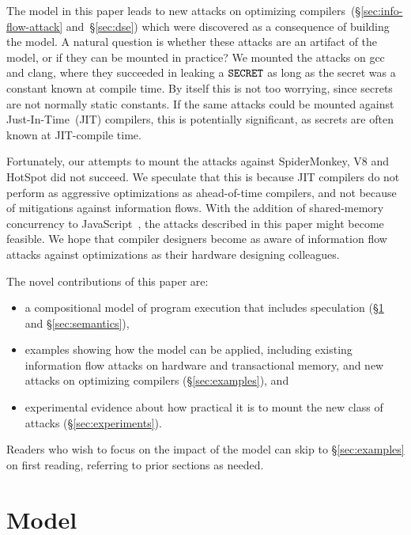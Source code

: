\documentclass[conference]{IEEEtran}
\theoremstyle{plain}
\theoremstyle{definition}
\begin{document}
The model in this paper leads to new attacks on optimizing
compilers~(\S\ref{sec:info-flow-attack} and~\S\ref{sec:dse}) which
were discovered as a consequence of building the model. A natural
question is whether these attacks are an artifact of the model, or if
they can be mounted in practice? We mounted the attacks on gcc and
clang, where they succeeded in leaking a $\texttt{SECRET}$ as long as the secret
was a constant known at compile time. By itself this is not too
worrying, since secrets are not normally static constants. If the same
attacks could be mounted against Just-In-Time~(JIT) compilers, this
is potentially significant, as secrets are often known at JIT-compile
time.

Fortunately, our attempts to mount the attacks against SpiderMonkey,
V8 and HotSpot did not succeed. We speculate that this is because
JIT compilers do not perform as aggressive optimizations as
ahead-of-time compilers, and not because of mitigations against
information flows. With the addition of shared-memory concurrency
to JavaScript~\cite[\S24.2]{ecma-262}, the attacks described in this paper might
become feasible. We hope that compiler designers become as
aware of information flow attacks against optimizations as their
hardware designing colleagues.

The novel contributions of this paper are:
\begin{itemize}

\item a compositional model of program execution that includes speculation
  (\S\ref{sec:model} and \S\ref{sec:semantics}),

\item examples showing how the model can be applied,
  including existing information flow attacks on
  hardware and transactional memory, and new attacks on optimizing compilers (\S\ref{sec:examples}), and

\item experimental evidence about how practical it is to mount
  the new class of attacks (\S\ref{sec:experiments}).

\end{itemize}
Readers who wish to focus on the impact of the model can skip to \S\ref{sec:examples}
on first reading, referring to prior sections as needed.


\section{Model}
\label{sec:model}
\end{document}
